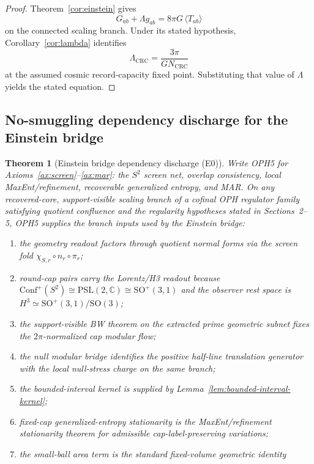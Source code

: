 \documentclass[11pt]{article}
\newtheorem{theorem}{Theorem}[section]
\begin{document}
\begin{proof}
Theorem~\ref{cor:einstein} gives
\[
G_{ab}+\Lambda g_{ab}=8\pi G\,\langle T_{ab}\rangle
\]
on the connected scaling branch. Under its stated hypothesis, Corollary~\ref{cor:lambda} identifies
\[
\Lambda_{\mathrm{CRC}}=\frac{3\pi}{G N_{\mathrm{CRC}}}
\]
at the assumed cosmic record-capacity fixed point. Substituting that value of \(\Lambda\) yields the stated equation.
\end{proof}

\subsection{No-smuggling dependency discharge for the Einstein bridge}

\begin{theorem}[Einstein bridge dependency discharge (E0)]\label{thm:einstein-bridge-discharge}
Write OPH5 for Axioms~\ref{ax:screen}--\ref{ax:mar}: the \(S^2\) screen net,
overlap consistency, local MaxEnt/refinement, recoverable generalized entropy,
and MAR.  On any recovered-core, support-visible scaling branch of a cofinal
OPH regulator family satisfying quotient confluence and the regularity
hypotheses stated in Sections~2--5, OPH5 supplies the branch inputs used by the
Einstein bridge:
\begin{enumerate}[leftmargin=2em,label=(\roman*)]
\item the geometry readout factors through quotient normal forms via the
screen fold \(\chi_{S,r}\circ n_r\circ\pi_r\);
\item round-cap pairs carry the Lorentz/H3 readout because
\(\mathrm{Conf}^+(S^2)\cong \mathrm{PSL}(2,\mathbb C)\cong
\mathrm{SO}^+(3,1)\) and the observer rest space is
\(H^3\simeq\mathrm{SO}^+(3,1)/\mathrm{SO}(3)\);
\item the support-visible BW theorem on the extracted prime geometric subnet
fixes the \(2\pi\)-normalized cap modular flow;
\item the null modular bridge identifies the positive half-line translation
generator with the local null-stress charge on the same branch;
\item the bounded-interval kernel is supplied by
Lemma~\ref{lem:bounded-interval-kernel};
\item fixed-cap generalized-entropy stationarity is the MaxEnt/refinement
stationarity theorem for admissible cap-label-preserving variations;
\item the small-ball area term is the standard fixed-volume geometric identity

\end{enumerate}
\end{theorem}
\end{document}
